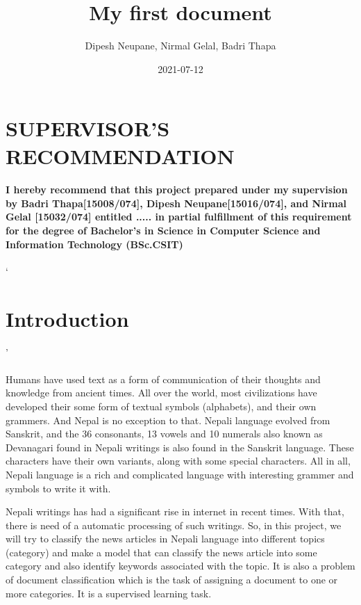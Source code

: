 \documentclass[12pt]{article}
\title{My first document}
\date{2021-07-12}
\author{Dipesh Neupane, Nirmal Gelal, Badri Thapa}
\begin{document}
    \maketitle
    \newpage
    \section{SUPERVISOR'S RECOMMENDATION}
    \paragraph{
        I hereby recommend that this project prepared under my supervision by Badri Thapa[15008/074], Dipesh Neupane[15016/074], and Nirmal Gelal [15032/074]
    entitled ..... in partial fulfillment of this requirement for the degree of Bachelor's in Science in Computer Science and Information Technology (BSc.CSIT)
    }
    
`    \section{Introduction}'
    \paragraph{}
        Humans have used text as a form of communication of their thoughts and knowledge from ancient times. All over the world, most civilizations have developed their some form of textual symbols 
        (alphabets), and  their own grammers.
        And Nepal is no exception to that. Nepali language evolved from Sanskrit, and the 36 consonants, 13 vowels and 10 numerals also known as Devanagari found in Nepali writings is also found 
        in the Sanskrit language. 
        These characters have their own variants, along with some special characters. All in all, Nepali language is a rich and complicated language with interesting grammer and symbols to write it with.
        
        Nepali writings has had a significant rise in internet in recent times. With that, there is need of a automatic processing of such writings.         
        So, in this project, we will try to classify the news articles in Nepali language into different topics (category) and make a model that can classify the news article into some category 
        and also identify keywords associated with the topic. 
        It is also a problem of document classification which is the task of assigning a document to one or more categories. It is a supervised learning task. 
\end{document}
